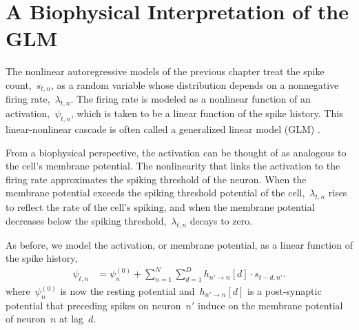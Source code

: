 \section{A Biophysical Interpretation of the GLM}
The nonlinear autoregressive models of the previous chapter 
treat the spike count,~$s_{t,n}$, as a random variable whose 
distribution depends on a nonnegative firing rate,~$\lambda_{t,n}$.
The firing rate is modeled as a nonlinear function of an activation,~$\psi_{t,n}$,
which is taken to be a linear function of the spike history.
This linear-nonlinear cascade is often called a generalized linear model (GLM) 
\citep{Paninski-2004, Truccolo-2005}.

From a biophysical perspective, the activation can be thought of as 
analogous to the cell's membrane potential. The nonlinearity that 
links the activation to the firing rate approximates the spiking 
threshold of the neuron.
 When the membrane potential exceeds the spiking threshold
potential of the cell,~$\lambda_{t,n}$ rises to reflect the rate of the
cell's spiking, and when the membrane potential decreases below the
spiking threshold,~$\lambda_{t,n}$ decays to zero. 

As before, we model the activation, or membrane potential,
 as a linear function of the spike history,
\begin{align}
  \label{eqn:glm_rate}
  \psi_{t,n} &= \psi_n^{(0)} + \sum_{n=1}^N \sum_{d=1}^D h_{n' \to n}[d] \cdot s_{t-d, n'}.
\end{align}
where~$\psi_n^{(0)}$ is now the resting potential and~$h_{n'\to n}[d]$
is a post-synaptic potential that preceding spikes on
neuron~$n'$ induce on the membrane potential of neuron~$n$ at lag~$d$. 

